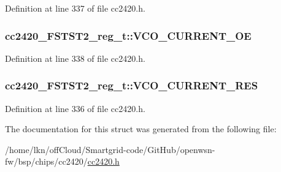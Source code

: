 Definition at line 337 of file cc2420.\+h.

\subsubsection[{\texorpdfstring{V\+C\+O\+\_\+\+C\+U\+R\+R\+E\+N\+T\+\_\+\+OE}{VCO_CURRENT_OE}}]{ cc2420\+\_\+\+F\+S\+T\+S\+T2\+\_\+reg\+\_\+t\+::\+V\+C\+O\+\_\+\+C\+U\+R\+R\+E\+N\+T\+\_\+\+OE}\hypertarget{structcc2420___f_s_t_s_t2__reg__t_a0656f01580fd851e8b000184369ff6b3}{}\label{structcc2420___f_s_t_s_t2__reg__t_a0656f01580fd851e8b000184369ff6b3}


Definition at line 338 of file cc2420.\+h.

\subsubsection[{\texorpdfstring{V\+C\+O\+\_\+\+C\+U\+R\+R\+E\+N\+T\+\_\+\+R\+ES}{VCO_CURRENT_RES}}]{ cc2420\+\_\+\+F\+S\+T\+S\+T2\+\_\+reg\+\_\+t\+::\+V\+C\+O\+\_\+\+C\+U\+R\+R\+E\+N\+T\+\_\+\+R\+ES}\hypertarget{structcc2420___f_s_t_s_t2__reg__t_a726263a3e4480b6f99a3354d36ffa569}{}\label{structcc2420___f_s_t_s_t2__reg__t_a726263a3e4480b6f99a3354d36ffa569}


Definition at line 336 of file cc2420.\+h.



The documentation for this struct was generated from the following file\+:\begin{DoxyCompactItemize}
\item 
/home/lkn/off\+Cloud/\+Smartgrid-\/code/\+Git\+Hub/openwsn-\/fw/bsp/chips/cc2420/\hyperlink{cc2420_8h}{cc2420.\+h}\end{DoxyCompactItemize}
